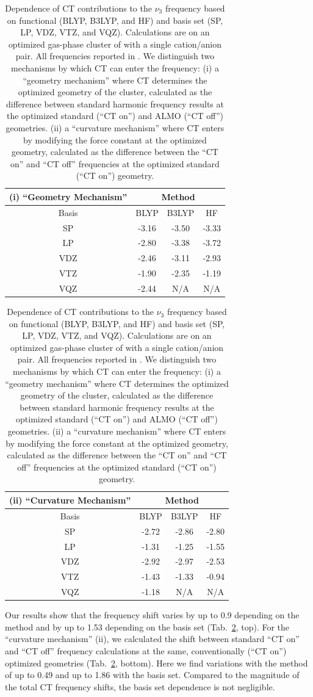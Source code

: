 \begin{table}
  \centering
  \caption[Charge transfer dependence of \texorpdfstring{ \(\nu_3\)}{carbon dioxide asymmetric stretch} frequencies]{Dependence of CT contributions to the \(\nu_3\) frequency based on functional (BLYP, B3LYP, and HF) and basis set (SP, LP, VDZ, VTZ, and VQZ). Calculations are on an optimized gas-phase cluster of  with a single cation/anion pair. All frequencies reported in \si{\wavenumber}. We distinguish two mechanisms by which CT can enter the frequency: (i) a ``geometry mechanism'' where CT determines the optimized geometry of the cluster, calculated as the difference between standard harmonic frequency results at the optimized standard (``CT on'') and ALMO (``CT off'') geometries. (ii) a ``curvature mechanism'' where CT enters by modifying the force constant at the optimized geometry, calculated as the difference between the ``CT on'' and ``CT off'' frequencies at the optimized standard (``CT on'') geometry.}
  \label{paper_02:tab:3}
  \begin{tabular}{cccc}
    (i) ``Geometry Mechanism'' & \multicolumn{3}{c}{Method} \\
    \hline
    Basis & BLYP & B3LYP & HF \\
    \hline
    SP & -3.16 & -3.50 & -3.33 \\
    LP & -2.80 & -3.38 & -3.72 \\
    VDZ & -2.46 & -3.11 & -2.93 \\
    VTZ & -1.90 & -2.35 & -1.19 \\
    VQZ & -2.44 & N/A & N/A
  \end{tabular}
  \begin{tabular}{cccc}
    (ii) ``Curvature Mechanism'' & \multicolumn{3}{c}{Method} \\
    \hline
    Basis & BLYP & B3LYP & HF \\
    \hline
    SP & -2.72 & -2.86 & -2.80 \\
    LP & -1.31 & -1.25 & -1.55 \\
    VDZ & -2.92 & -2.97 & -2.53 \\
    VTZ & -1.43 & -1.33 & -0.94 \\
    VQZ & -1.18 & N/A & N/A
  \end{tabular}
\end{table}

Our results show that the frequency shift varies by up to \SI{0.9}{\wavenumber} depending on the method and by up to \SI{1.53}{\wavenumber} depending on the basis set (Tab.~\ref{paper_02:tab:3}, top). For the ``curvature mechanism'' (ii), we calculated the shift between standard ``CT on'' and ``CT off'' frequency calculations at the same, conventionally (``CT on'') optimized geometries (Tab.~\ref{paper_02:tab:3}, bottom). Here we find variations with the method of up to \SI{0.49}{\wavenumber} and up to \SI{1.86}{\wavenumber} with the basis set. Compared to the magnitude of the total CT frequency shifts, the basis set dependence is not negligible.

